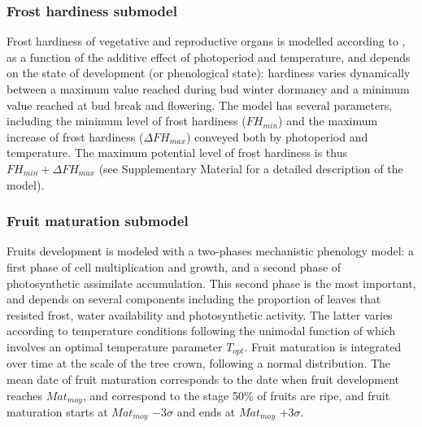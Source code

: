 \documentclass[letterpaper,8pt]{extarticle}  %
\begin{document}
\begin{doublespacing}
\begin{linenumbers}


\subsubsection{Frost hardiness submodel}

Frost hardiness of vegetative and reproductive organs is modelled according to \citet{Leinonen1996}, as a function of the additive effect of photoperiod and temperature, and depends on the state of development (or phenological state): hardiness varies dynamically between a maximum value reached during bud winter dormancy and a minimum value reached at bud break and flowering. The model has several parameters, including the minimum level of frost hardiness ($FH_{min}$) and the maximum increase of frost hardiness ($\Delta FH_{max}$) conveyed both by photoperiod and temperature. The maximum potential level of frost hardiness is thus $FH_{min}+\Delta FH_{max}$ (see Supplementary Material for a detailed description of the model). 

\subsubsection{Fruit maturation submodel}

Fruits development is modeled with a two-phases mechanistic phenology model:  a first phase of cell multiplication and growth, and a second phase of photosynthetic assimilate accumulation. This second phase is the most important, and depends on several components including the proportion of leaves that resisted frost, water availability and photosynthetic activity. The latter varies according to temperature conditions following the unimodal function of \citet{Wang1998} which involves an optimal temperature parameter $T_{opt}$.  Fruit maturation is integrated over time at the scale of the tree crown, following a normal distribution. The mean date of fruit maturation corresponds to the date when fruit development reaches $Mat_{moy}$, and correspond to the stage 50\% of fruits are ripe,  and fruit maturation starts at $Mat_{moy}$ $-3\sigma$ and ends at $Mat_{moy}$ $+3\sigma$.


\end{linenumbers}
\end{doublespacing}
\end{document}

